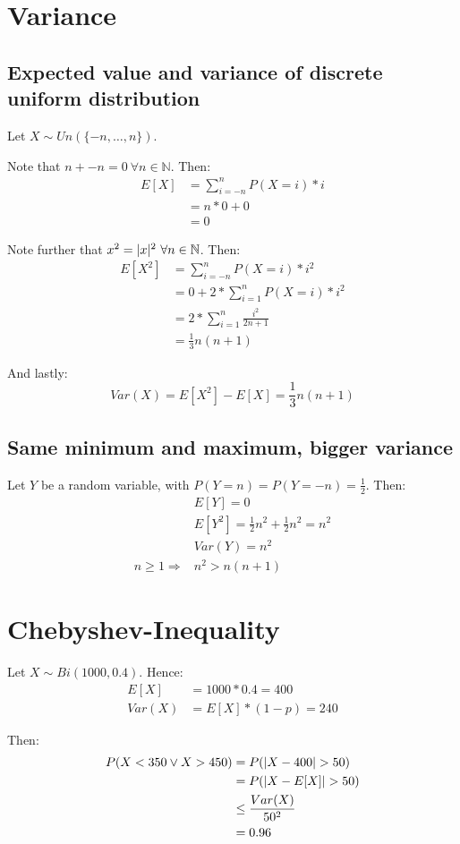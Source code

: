 \documentclass[a4paper]{scrreprt}
\DeclarePairedDelimiter\abs{\lvert}{\rvert}
\begin{document}
\section{Variance}

\subsection{Expected value and variance of discrete uniform distribution}

Let $X \sim Un(\{-n, \ldots, n\})$.

Note that $n + -n = 0\ \forall n \in \mathbb{N}$. Then:
\begin{align*}
	E[X] & = \sum_{i=-n}^n{P(X=i) * i} \\
	& = n * 0 + 0 \\
	& = 0
\end{align*}

Note further that $x^2 = \abs{x}^2\ \forall n \in \mathbb{N}$. Then:
\begin{align*}
	E[X^2] & = \sum_{i=-n}^n{P(X = i) * i^2} \\
	& = 0 + 2 * \sum_{i=1}^n{P(X = i) * i^2} \\
	& = 2 * \sum_{i=1}^n{\frac{i^2}{2n + 1}} \\
	& = \frac{1}{3} n (n + 1)
\end{align*}

And lastly:
\[
	Var(X) = E[X^2] - E[X] = \frac{1}{3} n (n+1)
\]

\subsection{Same minimum and maximum, bigger variance}

Let $Y$ be a random variable, with $P(Y = n) = P(Y = -n) = \frac{1}{2}$. Then:
\begin{align*}
	& E[Y] = 0 \\
	& E[Y^2] = \frac{1}{2} n^2 + \frac{1}{2} n^2 = n^2 \\
	& Var(Y) = n^2 \\
	n \geq 1 \Rightarrow & n^2 > n (n + 1)
\end{align*}

\section{Chebyshev-Inequality}

Let $X \sim Bi(1000, 0.4)$. Hence:
\begin{align*}
	E[X] & = 1000 * 0.4 = 400 \\
	Var(X) & = E[X] * (1-p) = 240
\end{align*}

Then:
\begin{align*}
	P(X < 350 \lor X > 450) & = P(\abs{X - 400} > 50) \\
				& = P(\abs{X - E[X]} > 50) \\
	   & \leq \frac{Var(X)}{50^2} \\
	   & = 0.96
\end{align*}
\end{document}
